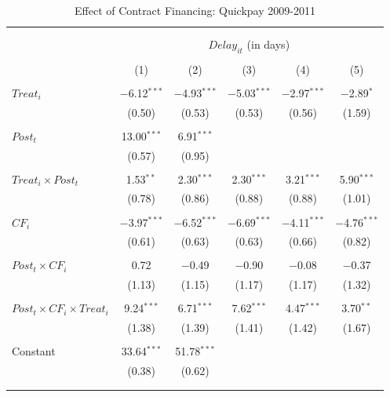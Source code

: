 \documentclass[
]{article}
\begin{document}
\begin{table}[H] \centering 
  \caption{Effect of Contract Financing: Quickpay 2009-2011} 
  \label{} 
\small 
\begin{tabular}{@{\extracolsep{-2pt}}lccccc} 
\\[-1.8ex]\hline 
\hline \\[-1.8ex] 
\\[-1.8ex] & \multicolumn{5}{c}{$Delay_{it}$ (in days)} \\ 
\\[-1.8ex] & (1) & (2) & (3) & (4) & (5)\\ 
\hline \\[-1.8ex] 
 $Treat_i$ & $-$6.12$^{***}$ & $-$4.93$^{***}$ & $-$5.03$^{***}$ & $-$2.97$^{***}$ & $-$2.89$^{*}$ \\ 
  & (0.50) & (0.53) & (0.53) & (0.56) & (1.59) \\ 
  & & & & & \\ 
 $Post_t$ & 13.00$^{***}$ & 6.91$^{***}$ &  &  &  \\ 
  & (0.57) & (0.95) &  &  &  \\ 
  & & & & & \\ 
 $Treat_i \times Post_t$ & 1.53$^{**}$ & 2.30$^{***}$ & 2.30$^{***}$ & 3.21$^{***}$ & 5.90$^{***}$ \\ 
  & (0.78) & (0.86) & (0.88) & (0.88) & (1.01) \\ 
  & & & & & \\ 
 $CF_i$ & $-$3.97$^{***}$ & $-$6.52$^{***}$ & $-$6.69$^{***}$ & $-$4.11$^{***}$ & $-$4.76$^{***}$ \\ 
  & (0.61) & (0.63) & (0.63) & (0.66) & (0.82) \\ 
  & & & & & \\ 
 $Post_t \times CF_i$ & 0.72 & $-$0.49 & $-$0.90 & $-$0.08 & $-$0.37 \\ 
  & (1.13) & (1.15) & (1.17) & (1.17) & (1.32) \\ 
  & & & & & \\ 
 $Post_t \times CF_i \times Treat_i$ & 9.24$^{***}$ & 6.71$^{***}$ & 7.62$^{***}$ & 4.47$^{***}$ & 3.70$^{**}$ \\ 
  & (1.38) & (1.39) & (1.41) & (1.42) & (1.67) \\ 
  & & & & & \\ 
 Constant & 33.64$^{***}$ & 51.78$^{***}$ &  &  &  \\ 
  & (0.38) & (0.62) &  &  &  \\ 
  & & & & & \\ 
\hline \\[-1.8ex] 

\end{tabular}
\end{table}
\end{document}
